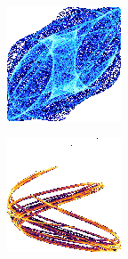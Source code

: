 \documentclass[11pt,francais]{article}
\begin{document}
\begin{figure}[h!]
    \centering
    \begin{subfigure}[b]{0.20\textwidth}
        \includegraphics[width=\textwidth]{Figures/FDD/-0,00545687187361743_-0,5312304575586382_1,8197494653032407_2,422111729355857_1,4944898296889655_2,487490210145214.png}
    \end{subfigure}
    \begin{subfigure}[b]{0.20\textwidth}
        \includegraphics[width=\textwidth]{Figures/FDD/-0,319459804135373_-0,0981842500805612_0,42291442353441633_1,7253282321258185_1,4272325555244099_1,3701336149016234.png}

\end{subfigure}
\end{figure}
\end{document}
